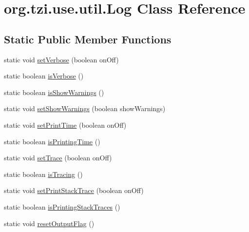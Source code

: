 \hypertarget{classorg_1_1tzi_1_1use_1_1util_1_1_log}{\section{org.\-tzi.\-use.\-util.\-Log Class Reference}
\label{classorg_1_1tzi_1_1use_1_1util_1_1_log}
}
\subsection*{Static Public Member Functions}
\begin{DoxyCompactItemize}
\item 
static void \hyperlink{classorg_1_1tzi_1_1use_1_1util_1_1_log_ac6b4f5b897315d906463424d43f83ea4}{set\-Verbose} (boolean on\-Off)
\item 
static boolean \hyperlink{classorg_1_1tzi_1_1use_1_1util_1_1_log_a7f3480314ec671937f05826f903d9995}{is\-Verbose} ()
\item 
static boolean \hyperlink{classorg_1_1tzi_1_1use_1_1util_1_1_log_a2b46093bae084c4cd23f84418ae6b45d}{is\-Show\-Warnings} ()
\item 
static void \hyperlink{classorg_1_1tzi_1_1use_1_1util_1_1_log_a7b9c1c052ae376c28bb15828698099ff}{set\-Show\-Warnings} (boolean show\-Warnings)
\item 
static void \hyperlink{classorg_1_1tzi_1_1use_1_1util_1_1_log_a57a6814340d39a0055d87aaa8d4d1897}{set\-Print\-Time} (boolean on\-Off)
\item 
static boolean \hyperlink{classorg_1_1tzi_1_1use_1_1util_1_1_log_a3a27c04cacbec11e5c105d5ae2dcd17c}{is\-Printing\-Time} ()
\item 
static void \hyperlink{classorg_1_1tzi_1_1use_1_1util_1_1_log_a2f7d365999ce7968b4f84453f6f23267}{set\-Trace} (boolean on\-Off)
\item 
static boolean \hyperlink{classorg_1_1tzi_1_1use_1_1util_1_1_log_a3d6d31128d2ec2393bf07587f0524796}{is\-Tracing} ()
\item 
static void \hyperlink{classorg_1_1tzi_1_1use_1_1util_1_1_log_a5bb251c572007fb77a3570c40c8ce94b}{set\-Print\-Stack\-Trace} (boolean on\-Off)
\item 
static boolean \hyperlink{classorg_1_1tzi_1_1use_1_1util_1_1_log_a042efbda5836cc11711bb56ee6a9b806}{is\-Printing\-Stack\-Traces} ()
\item 
static void \hyperlink{classorg_1_1tzi_1_1use_1_1util_1_1_log_a7a6f5bd854feceede8f3c59918db5318}{reset\-Output\-Flag} ()
\item 

\end{DoxyCompactItemize}
